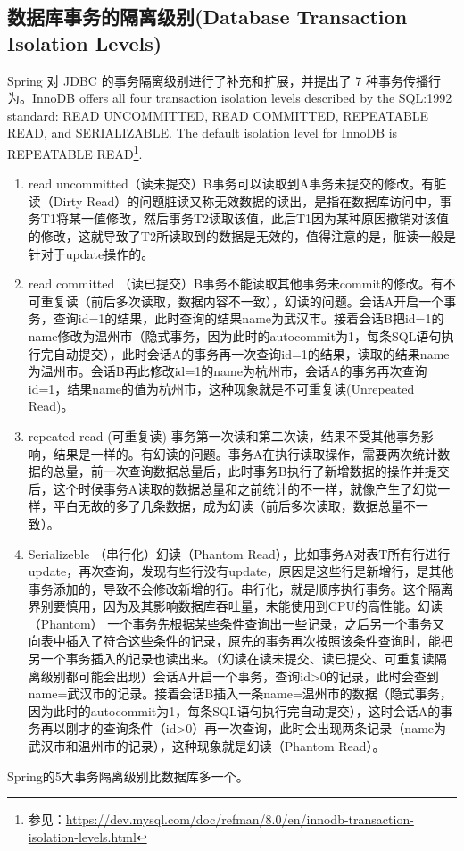 \documentclass[../../../interview-questions.tex]{subfiles}
\begin{document}
\subsection{数据库事务的隔离级别(Database Transaction Isolation Levels)}

Spring 对 JDBC 的事务隔离级别进行了补充和扩展，并提出了 7 种事务传播行为。InnoDB offers all four transaction isolation levels described by the SQL:1992 standard: READ UNCOMMITTED, READ COMMITTED, REPEATABLE READ, and SERIALIZABLE. The default isolation level for InnoDB is REPEATABLE READ\footnote{参见：\url{https://dev.mysql.com/doc/refman/8.0/en/innodb-transaction-isolation-levels.html}}.

\begin{enumerate}
\item {read uncommitted（读未提交）B事务可以读取到A事务未提交的修改。有脏读（Dirty Read）的问题}脏读又称无效数据的读出，是指在数据库访问中，事务T1将某一值修改，然后事务T2读取该值，此后T1因为某种原因撤销对该值的修改，这就导致了T2所读取到的数据是无效的，值得注意的是，脏读一般是针对于update操作的。
\item{read committed （读已提交）B事务不能读取其他事务未commit的修改。有不可重复读（前后多次读取，数据内容不一致），幻读的问题。}会话A开启一个事务，查询id=1的结果，此时查询的结果name为武汉市。接着会话B把id=1的name修改为温州市（隐式事务，因为此时的autocommit为1，每条SQL语句执行完自动提交），此时会话A的事务再一次查询id=1的结果，读取的结果name为温州市。会话B再此修改id=1的name为杭州市，会话A的事务再次查询id=1，结果name的值为杭州市，这种现象就是不可重复读(Unrepeated Read)。
\item{repeated read (可重复读) 事务第一次读和第二次读，结果不受其他事务影响，结果是一样的。有幻读的问题。事务A在执行读取操作，需要两次统计数据的总量，前一次查询数据总量后，此时事务B执行了新增数据的操作并提交后，这个时候事务A读取的数据总量和之前统计的不一样，就像产生了幻觉一样，平白无故的多了几条数据，成为幻读（前后多次读取，数据总量不一致）。}
\item{Serializeble （串行化）幻读（Phantom Read），比如事务A对表T所有行进行update，再次查询，发现有些行没有update，原因是这些行是新增行，是其他事务添加的，导致不会修改新增的行。串行化，就是顺序执行事务。这个隔离界别要慎用，因为及其影响数据库吞吐量，未能使用到CPU的高性能。}幻读（Phantom）
一个事务先根据某些条件查询出一些记录，之后另一个事务又向表中插入了符合这些条件的记录，原先的事务再次按照该条件查询时，能把另一个事务插入的记录也读出来。（幻读在读未提交、读已提交、可重复读隔离级别都可能会出现）会话A开启一个事务，查询id>0的记录，此时会查到name=武汉市的记录。接着会话B插入一条name=温州市的数据（隐式事务，因为此时的autocommit为1，每条SQL语句执行完自动提交），这时会话A的事务再以刚才的查询条件（id>0）再一次查询，此时会出现两条记录（name为武汉市和温州市的记录），这种现象就是幻读（Phantom Read）。
\end{enumerate}

Spring的5大事务隔离级别比数据库多一个。
\end{document}
